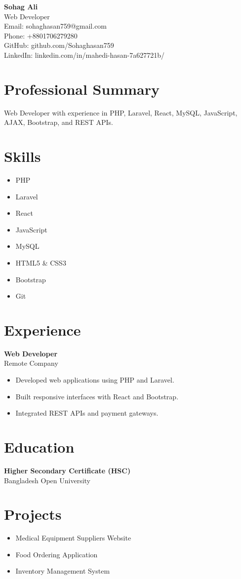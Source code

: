 \documentclass[11pt]{article}
\begin{document}
\begin{center}
    {\LARGE \textbf{Sohag Ali}}\\
    Web Developer\\
    Email: sohaghasan759@gmail.com\\
    Phone: +8801706279280\\
    GitHub: github.com/Sohaghasan759\\
    LinkedIn: linkedin.com/in/mahedi-hasan-7a627721b/
\end{center}

\section*{Professional Summary}
Web Developer with experience in PHP, Laravel, React, MySQL, JavaScript, AJAX, Bootstrap, and REST APIs.

\section*{Skills}
\begin{itemize}
\item PHP
\item Laravel
\item React
\item JavaScript
\item MySQL
\item HTML5 \& CSS3
\item Bootstrap
\item Git
\end{itemize}

\section*{Experience}
\textbf{Web Developer}\\
Remote Company

\begin{itemize}
\item Developed web applications using PHP and Laravel.
\item Built responsive interfaces with React and Bootstrap.
\item Integrated REST APIs and payment gateways.
\end{itemize}

\section*{Education}
\textbf{Higher Secondary Certificate (HSC)}\\
Bangladesh Open University\\

\section*{Projects}
\begin{itemize}
\item Medical Equipment Suppliers Website
\item Food Ordering Application
\item Inventory Management System
\end{itemize}
\end{document}
